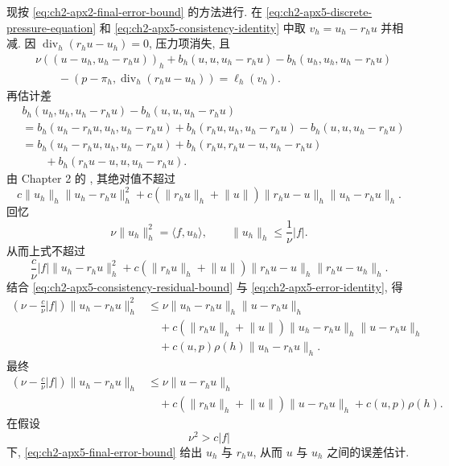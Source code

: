 \hypertarget{chapter-02-page-161}{}
现按 \eqref{eq:ch2-apx2-final-error-bound} 的方法进行. 在 \eqref{eq:ch2-apx5-discrete-pressure-equation} 和 \eqref{eq:ch2-apx5-consistency-identity} 中取 $v_h=u_h-r_hu$ 并相减. 因 $\operatorname{div}_h(r_hu-u_h)=0$, 压力项消失, 且
\begin{equation}
\begin{aligned}
&\nu((u-u_h,u_h-r_hu))_h
+b_h(u,u,u_h-r_hu)-b_h(u_h,u_h,u_h-r_hu)\\
&\qquad-(p-\pi_h,\operatorname{div}_h(r_hu-u_h))=\ell_h(v_h).
\end{aligned}
\label{eq:ch2-apx5-error-identity}
\end{equation}
再估计差
\[
\begin{aligned}
&b_h(u_h,u_h,u_h-r_hu)-b_h(u,u,u_h-r_hu)\\
&=b_h(u_h-r_hu,u_h,u_h-r_hu)
+b_h(r_hu,u_h,u_h-r_hu)-b_h(u,u,u_h-r_hu)\\
&=b_h(u_h-r_hu,u_h,u_h-r_hu)
+b_h(r_hu,r_hu-u,u_h-r_hu)\\
&\qquad+b_h(r_hu-u,u,u_h-r_hu).
\end{aligned}
\]
由 Chapter 2 的 , 其绝对值不超过
\begin{equation}
c\lVert u_h\rVert_h\lVert u_h-r_hu\rVert_h^2
+c(\lVert r_hu\rVert_h+\lVert u\rVert)
\lVert r_hu-u\rVert_h\lVert u_h-r_hu\rVert_h.
\label{eq:ch2-apx5-nonlinear-error-bound}
\end{equation}
回忆
\[
\nu\lVert u_h\rVert_h^2=\langle f,u_h\rangle,
\qquad
\lVert u_h\rVert_h\leq\frac1\nu|f|.
\]
从而上式不超过
\begin{equation}
\frac c\nu|f|\lVert u_h-r_hu\rVert_h^2
+c(\lVert r_hu\rVert_h+\lVert u\rVert)
\lVert r_hu-u\rVert_h\lVert r_hu-u_h\rVert_h.
\label{eq:ch2-apx5-nonlinear-error-force-bound}
\end{equation}
结合 \eqref{eq:ch2-apx5-consistency-residual-bound} 与 \eqref{eq:ch2-apx5-error-identity}, 得
\begin{equation}
\begin{aligned}
\left(\nu-\frac c\nu|f|\right)\lVert u_h-r_hu\rVert_h^2
&\leq\nu\lVert u_h-r_hu\rVert_h\lVert u-r_hu\rVert_h\\
&\quad+c(\lVert r_hu\rVert_h+\lVert u\rVert)
\lVert u_h-r_hu\rVert_h\lVert u-r_hu\rVert_h\\
&\quad+c(u,p)\rho(h)\lVert u_h-r_hu\rVert_h.
\end{aligned}
\label{eq:ch2-apx5-quadratic-error-bound}
\end{equation}
最终
\begin{equation}
\begin{aligned}
\left(\nu-\frac c\nu|f|\right)\lVert u_h-r_hu\rVert_h
&\leq\nu\lVert u-r_hu\rVert_h\\
&\quad+c(\lVert r_hu\rVert_h+\lVert u\rVert)\lVert u-r_hu\rVert_h
+c(u,p)\rho(h).
\end{aligned}
\label{eq:ch2-apx5-final-error-bound}
\end{equation}
在假设
\begin{equation}
\nu^2>c|f|
\label{eq:ch2-apx5-error-condition}
\end{equation}
下, \eqref{eq:ch2-apx5-final-error-bound} 给出 $u_h$ 与 $r_hu$, 从而 $u$ 与 $u_h$ 之间的误差估计.

